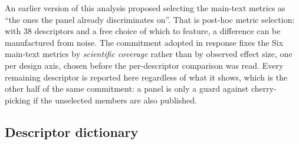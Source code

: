 \documentclass{article}
\newcommand{\MainMetricCount}{Six}            %
\newcommand{\PanelSize}{38}                   %
\begin{document}
An earlier version of this analysis proposed selecting the main-text metrics as ``the ones the panel
already discriminates on''. That is post-hoc metric selection: with \PanelSize{} descriptors and a
free choice of which to feature, a difference can be manufactured from noise. The commitment adopted
in response fixes the \MainMetricCount{} main-text metrics by \emph{scientific coverage} rather than
by observed effect size, one per design axis, chosen before the per-descriptor comparison was read.
Every remaining descriptor is reported here regardless of what it shows, which is the other half of
the same commitment: a panel is only a guard against cherry-picking if the unselected members are
also published.

\subsection{Descriptor dictionary}
\label{app:descriptor-dict}
\begingroup\small
\end{document}
